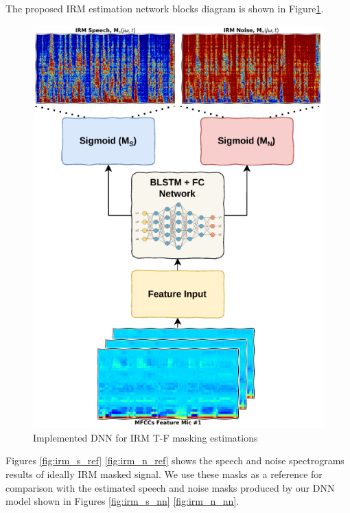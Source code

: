The proposed IRM estimation network blocks diagram is shown in 
Figure\;\ref{fig:irm_nn}.

\begin{figure}[H]
    \centering
    \includegraphics[width=0.75\linewidth]{Beamformers/images/irm_nn}
    \caption{Implemented DNN for IRM T-F masking estimations}\label{fig:irm_nn}
\end{figure}

Figures \ref{fig:irm_s_ref}  \ref{fig:irm_n_ref} 
shows the speech and noise spectrograms results of ideally
IRM masked signal. We use these masks as a reference for comparison
with the estimated speech and noise masks produced by our DNN model shown in
Figures \ref{fig:irm_s_nn}  \ref{fig:irm_n_nn}.

